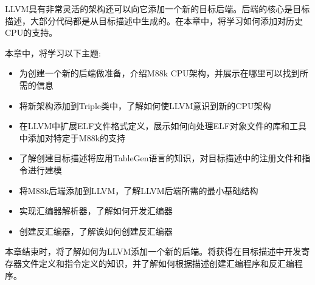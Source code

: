 LLVM具有非常灵活的架构还可以向它添加一个新的目标后端。后端的核心是目标描述，大部分代码都是从目标描述中生成的。在本章中，将学习如何添加对历史CPU的支持。

本章中，将学习以下主题:

\begin{itemize}
\item
为创建一个新的后端做准备，介绍M88k CPU架构，并展示在哪里可以找到所需的信息

\item
将新架构添加到Triple类中，了解如何使LLVM意识到新的CPU架构

\item
在LLVM中扩展ELF文件格式定义，展示如何向处理ELF对象文件的库和工具中添加对特定于M88k的支持

\item
了解创建目标描述将应用TableGen语言的知识，对目标描述中的注册文件和指令进行建模

\item
将M88k后端添加到LLVM，了解LLVM后端所需的最小基础结构

\item
实现汇编器解析器，了解如何开发汇编器

\item
创建反汇编器，了解诶如何创建反汇编器
\end{itemize}

本章结束时，将了解如何为LLVM添加一个新的后端。将获得在目标描述中开发寄存器文件定义和指令定义的知识，并了解如何根据描述创建汇编程序和反汇编程序。























